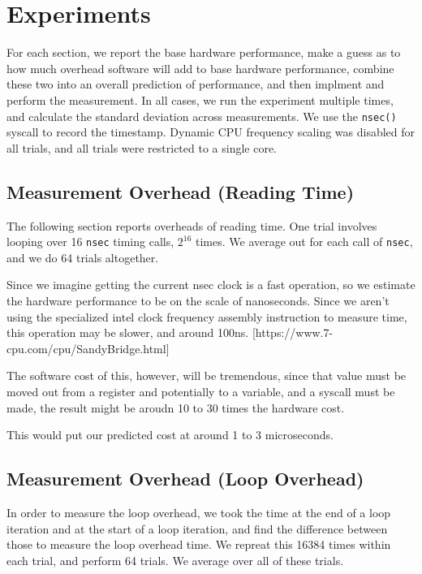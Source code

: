 \documentclass[letterpaper,twocolumn,10pt]{article}
\begin{document}
\section{Experiments}

For each section, we report the base hardware performance, make a guess as to how much overhead software will add to base hardware performance, combine these two into an overall prediction of performance, and then implment and perform the measurement. In all cases, we run the experiment multiple times, and calculate the standard deviation across measurements. We use the \texttt{nsec()} syscall to record the timestamp. Dynamic CPU frequency scaling was disabled for all trials, and all trials were restricted to a single core.

\subsection{Measurement Overhead (Reading Time)}

The following section reports overheads of reading time. One trial involves looping over 16 \texttt{nsec} timing calls, $2^{16}$ times. We average out for each call of \texttt{nsec}, and we do 64 trials altogether.

Since we imagine getting the current nsec clock is a fast operation, so we estimate the hardware performance to be on the scale of nanoseconds. Since we aren't using the specialized intel clock frequency assembly instruction to measure time, this operation may be slower, and around 100ns.
[https://www.7-cpu.com/cpu/SandyBridge.html]

The software cost of this, however, will be tremendous, since that value must be moved out from a register and potentially to a variable, and a syscall must be made, the result might be aroudn 10 to 30 times the hardware cost.

This would put our predicted cost at around 1 to 3 microseconds.

\subsection{Measurement Overhead (Loop Overhead)}

In order to measure the loop overhead, we took the time at the end of a loop
iteration and at the start of a loop iteration, and find the difference between
those to measure the loop overhead time. We repreat this 16384 times within
each trial, and perform 64 trials. We average over all of these trials.
\end{document}
